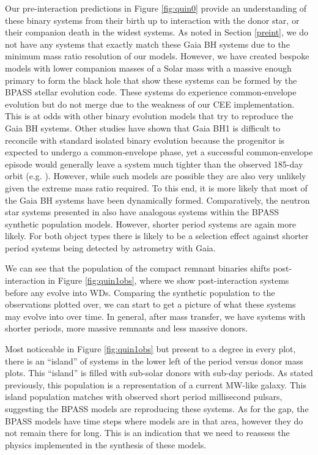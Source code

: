 \documentclass{pas}
\begin{document}
Our pre-interaction predictions in Figure \ref{fig:quin0} provide an understanding of these binary systems from their birth up to interaction with the donor star, or their companion death in the widest systems. As noted in Section \ref{preint}, we do not have any systems that exactly match these Gaia BH systems due to the minimum mass ratio resolution of our models. However, we have created bespoke models with lower companion masses of a Solar mass with a massive enough primary to form the black hole that show these systems can be formed by the \textsc{BPASS} stellar evolution code. These systems do experience common-envelope evolution but do not merge due to the weakness of our CEE implementation. This is at odds with other binary evolution models that try to reproduce the Gaia BH systems. Other studies have shown that Gaia BH1 is difficult to reconcile with standard isolated binary evolution because the progenitor is expected to undergo a common-envelope phase, yet a successful common-envelope episode would generally leave a system much tighter than the observed 185-day orbit (e.g. \citet{2023MNRAS.526..740R, 2023MNRAS.522.1763G}). However, while such models are possible they are also very unlikely given the extreme mass ratio required. To this end, it is more likely that most of the Gaia BH systems have been dynamically formed. Comparatively, the neutron star systems presented in \citet{elbadry2024populationneutronstarcandidates} also have analogous systems within the \textsc{BPASS} synthetic population models. However, shorter period systems are again more likely. For both object types there is likely to be a selection effect against shorter period systems being detected by astrometry with Gaia.

We can see that the population of the compact remnant binaries shifts post-interaction in Figure \ref{fig:quin1obs}, where we show post-interaction systems before any evolve into WDs. Comparing the synthetic population to the observations plotted over, we can start to get a picture of what these systems may evolve into over time. In general, after mass transfer, we have systems with shorter periods, more massive remnants and less massive donors. 

Most noticeable in Figure \ref{fig:quin1obs} but present to a degree in every plot, there is an ``island'' of systems in the lower left of the period versus donor mass plots. This ``island'' is filled with sub-solar donors with sub-day periods. As stated previously, this population is a representation of a current MW-like galaxy. This island population matches with observed short period millisecond pulsars, suggesting the \textsc{BPASS} models are reproducing these systems. As for the gap, the \textsc{BPASS} models have time steps where models are in that area, however they do not remain there for long. This is an indication that we need to reassess the physics implemented in the synthesis of these models.
\end{document}
